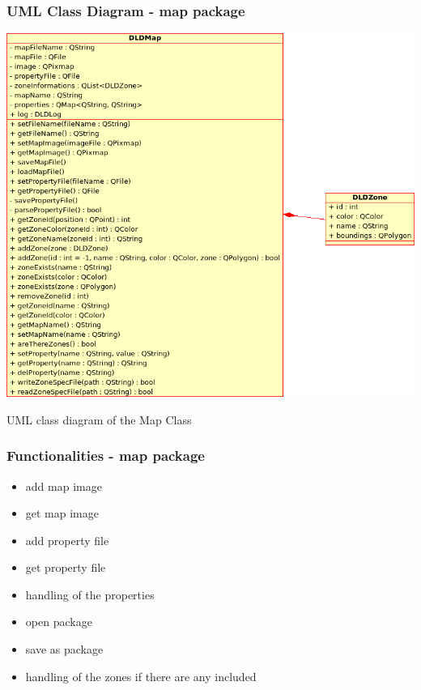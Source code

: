     \subsubsection{UML Class Diagram - map package}
     \begin{staticFigure}
      \centering
      \includegraphics[scale=0.55]{UMLDiagrams/dldMap.png}
      \caption{UML class diagram of the Map Class}
      \label{fg:projectModularization:map}
     \end{staticFigure}

    \subsubsection{Functionalities - map package}
    \begin{itemize}
     \item add map image
     \item get map image
     \item add property file
     \item get property file
     \item handling of the properties
     \item open package
     \item save as package
     \item handling of the zones if there are any included
    \end{itemize}

